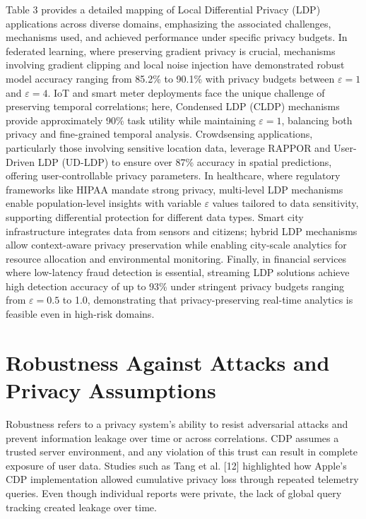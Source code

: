 \documentclass[conference]{IEEEtran}
\begin{document}
Table 3 provides a detailed mapping of Local Differential Privacy (LDP) applications across diverse domains, emphasizing the associated challenges, mechanisms used, and achieved performance under specific privacy budgets. In federated learning, where preserving gradient privacy is crucial, mechanisms involving gradient clipping and local noise injection have demonstrated robust model accuracy ranging from 85.2\% to 90.1\% with privacy budgets between $\varepsilon = 1$ and $\varepsilon = 4$. IoT and smart meter deployments face the unique challenge of preserving temporal correlations; here, Condensed LDP (CLDP) mechanisms provide approximately 90\% task utility while maintaining $\varepsilon = 1$, balancing both privacy and fine-grained temporal analysis. Crowdsensing applications, particularly those involving sensitive location data, leverage RAPPOR and User-Driven LDP (UD-LDP) to ensure over 87\% accuracy in spatial predictions, offering user-controllable privacy parameters. In healthcare, where regulatory frameworks like HIPAA mandate strong privacy, multi-level LDP mechanisms enable population-level insights with variable $\varepsilon$ values tailored to data sensitivity, supporting differential protection for different data types. Smart city infrastructure integrates data from sensors and citizens; hybrid LDP mechanisms allow context-aware privacy preservation while enabling city-scale analytics for resource allocation and environmental monitoring. Finally, in financial services where low-latency fraud detection is essential, streaming LDP solutions achieve high detection accuracy of up to 93\% under stringent privacy budgets ranging from $\varepsilon = 0.5$ to 1.0, demonstrating that privacy-preserving real-time analytics is feasible even in high-risk domains.

\section{Robustness Against Attacks and Privacy Assumptions}
Robustness refers to a privacy system's ability to resist adversarial attacks and prevent information leakage over time or across correlations. CDP assumes a trusted server environment, and any violation of this trust can result in complete exposure of user data. Studies such as Tang et al. [12] highlighted how Apple's CDP implementation allowed cumulative privacy loss through repeated telemetry queries. Even though individual reports were private, the lack of global query tracking created leakage over time.
\end{document}
